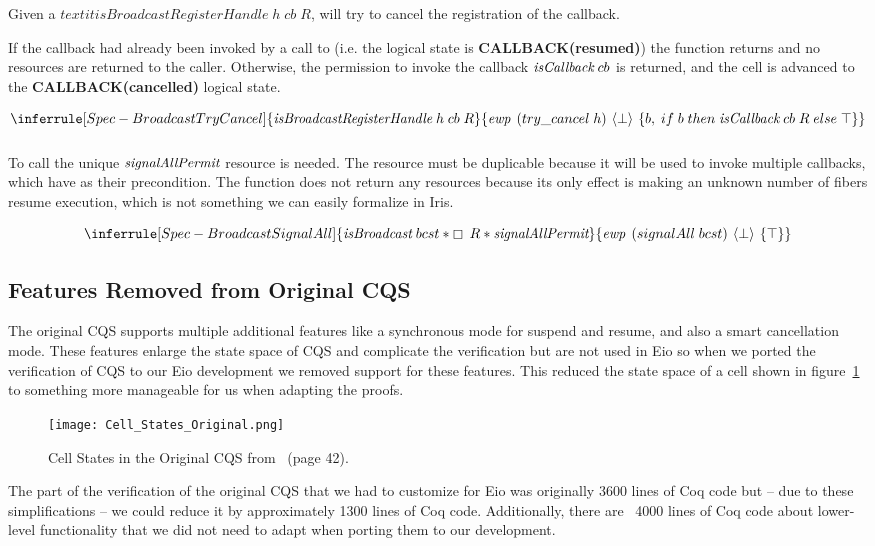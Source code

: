 Given a \(textit{isBroadcastRegisterHandle}\; h\; cb\; R\),  will try to cancel the registration of the callback.

If the callback had already been invoked by a call to  (i.e. the logical state is \textbf{CALLBACK(resumed)}) the function returns  and no resources are returned to the caller.
Otherwise, the permission to invoke the callback \(\emph{isCallback}{}\; cb\) is returned, and the cell is advanced to the \textbf{CALLBACK(cancelled)} logical state.

\[
  \inferrule[Spec-BroadcastTryCancel]
  { \emph{isBroadcastRegisterHandle}\; h\; cb\; R }
  { \ewp{try\_cancel\; h}{\bot}{b,\; if\; b\; then\; \gsIsCb{}\; cb\; R\; else\; \top}}
\]

\subsubsection{}
\label{sec:broadcast-spec-signal-all}

To call  the unique \(\emph{signalAllPermit}{}\) resource is needed.
The  resource must be duplicable because it will be used to invoke multiple callbacks, which have  as their precondition.
The function does not return any resources because its only effect is making an unknown number of fibers resume execution, which is not something we can easily formalize in Iris.

\[
  \inferrule[Spec-BroadcastSignalAll]
  { \gsIsBcst{}\; bcst \ast \always{}\;R \ast \gssignal{}}
  { \ewp{signalAll\; bcst}{\bot}{\top} }
\]

\subsection{Features Removed from Original CQS}
\label{sec:broadcast-spec-removed-features}

The original CQS supports multiple additional features like a synchronous mode for suspend and resume, and also a smart cancellation mode.
These features enlarge the state space of CQS and complicate the verification but are not used in Eio so when we ported the verification of CQS to our Eio development we removed support for these features.
This reduced the state space of a cell shown in figure~\ref{fig:cqs-cell-states-original} to something more manageable for us when adapting the proofs.

\begin{figure}[ht]
  \texttt{[image: Cell\_States\_Original.png]}
  \caption{Cell States in the Original CQS from~\cite{koval2023cqs} (page 42).}
  \label{fig:cqs-cell-states-original}
\end{figure}

The part of the verification of the original CQS that we had to customize for Eio was originally 3600 lines of Coq code but -- due to these simplifications -- we could reduce it by approximately 1300 lines of Coq code.
Additionally, there are ~4000 lines of Coq code about lower-level functionality that we did not need to adapt when porting them to our development.
